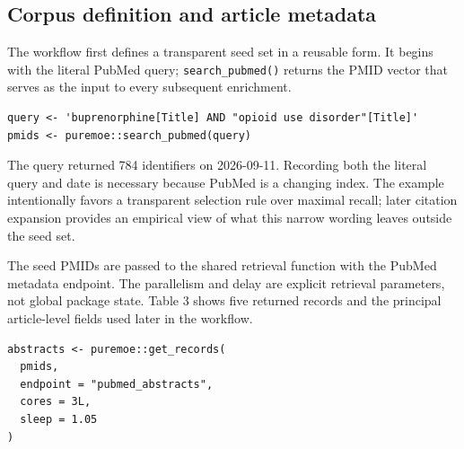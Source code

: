 \subsection{Corpus definition and article metadata}\label{corpus-definition-and-article-metadata}

The workflow first defines a transparent seed set in a reusable form. It begins
with the literal PubMed query; \texttt{search\_pubmed()} returns the PMID vector that
serves as the input to every subsequent enrichment.

\begin{verbatim}
query <- 'buprenorphine[Title] AND "opioid use disorder"[Title]'
pmids <- puremoe::search_pubmed(query)
\end{verbatim}

The query returned 784 identifiers on
2026-09-11. Recording both the literal query and
date is necessary because PubMed is a changing index. The example intentionally
favors a transparent selection rule over maximal recall; later citation
expansion provides an empirical view of what this narrow wording leaves outside
the seed set.

The seed PMIDs are passed to the shared retrieval function with the PubMed
metadata endpoint. The parallelism and delay are explicit retrieval parameters,
not global package state. Table 3 shows five returned records and the principal
article-level fields used later in the workflow.

\begin{verbatim}
abstracts <- puremoe::get_records(
  pmids,
  endpoint = "pubmed_abstracts",
  cores = 3L,
  sleep = 1.05
)
\end{verbatim}

